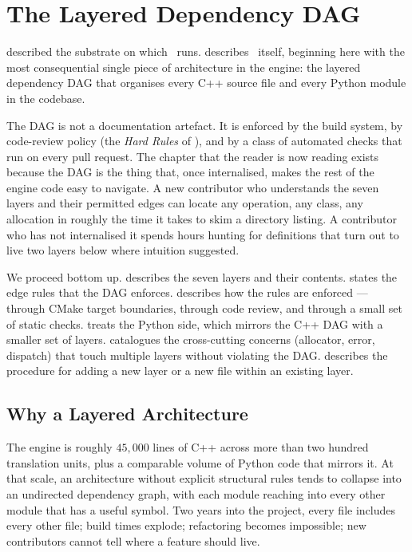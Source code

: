 \chapter{The Layered Dependency DAG}
\label{ch:layered_dag}

 described the substrate on which \Lucid\ runs.
 describes \Lucid\ itself, beginning here with
the most consequential single piece of architecture in the engine:
the layered dependency DAG that organises every C++ source file and
every Python module in the codebase.

The DAG is not a documentation artefact. It is enforced by the build
system, by code-review policy (the \emph{Hard Rules} of
), and by a class of automated checks that
run on every pull request. The chapter that the reader is now reading
exists because the DAG is the thing that, once internalised, makes
the rest of the engine code easy to navigate. A new contributor who
understands the seven layers and their permitted edges can locate
any operation, any class, any allocation in roughly the time it takes
to skim a directory listing. A contributor who has not internalised
it spends hours hunting for definitions that turn out to live two
layers below where intuition suggested.

We proceed bottom up.  describes the
seven layers and their contents. 
states the edge rules that the DAG enforces.
 describes how the rules are
enforced --- through CMake target boundaries, through code review,
and through a small set of static checks.
 treats the Python side, which
mirrors the C++ DAG with a smaller set of layers.
 catalogues the cross-cutting
concerns (allocator, error, dispatch) that touch multiple layers
without violating the DAG.  describes
the procedure for adding a new layer or a new file within an existing
layer.

\section{Why a Layered Architecture}
\label{sec:layered_dag:why}

The engine is roughly \(45{,}000\) lines of C++ across more than
two hundred translation units, plus a comparable volume of Python
code that mirrors it. At that scale, an architecture without
explicit structural rules tends to collapse into an undirected
dependency graph, with each module reaching into every other module
that has a useful symbol. Two years into the project, every file
includes every other file; build times explode; refactoring becomes
impossible; new contributors cannot tell where a feature should
live.


